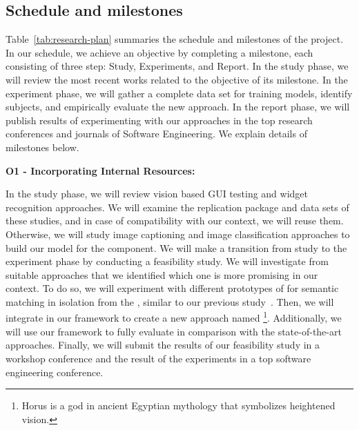 \subsection{Schedule and milestones}



Table~\ref{tab:research-plan} summaries the schedule and milestones of the \project project.
In our schedule, we achieve an objective by completing a milestone, each consisting of three step: Study, Experiments, and Report. 
 In the study phase, we will review the most recent works related to the objective of its milestone.
In the experiment phase, we will gather a complete data set for training models,  identify subjects, and empirically evaluate the new approach. 
In the report phase, we will publish results of experimenting with our approaches in  the top research conferences and journals of Software Engineering.
We explain details of milestones below.

\bigskip
\noindent
\textbf{O1 - Incorporating Internal Resources:}  

\bigskip
\noindent
In the study phase, we will review vision based GUI testing  and widget recognition approaches. 
We will examine the replication package and data sets of these studies, and in case of compatibility with our context, we will reuse them. 
Otherwise, we will study image captioning and image classification approaches to build our model for the \imagelabeler component.
%
We will make a transition from study to the experiment phase by conducting a feasibility study. 
We will investigate from suitable approaches that we identified which one is more promising in our context.
To do so, we will experiment with different prototypes of \imagelabeler for semantic matching in isolation from the \testreuse,  similar to our previous study~\cite{mariani:SemFinder:ISSTA:2021}. 
Then, we will integrate \imagelabeler in our \tme framework to create a new \testreuse approach named \visiontool\footnote{Horus is a god in ancient Egyptian mythology that symbolizes heightened vision.}.
Additionally, we will use our \tme framework to fully evaluate \visiontool in comparison with the state-of-the-art \testreuse approaches.
Finally, we will submit the results of our  feasibility study in a workshop conference and the result of the \testreuse experiments in a top software engineering conference. 

